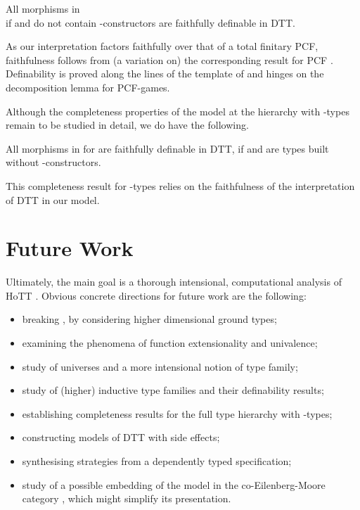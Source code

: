 \documentclass[runningheads,a4paper]{llncs}
\begin{document}
\begin{theorem}\label{thm:fdef} All morphisms in \\  if  and  do not contain -constructors are faithfully definable in \textsf{DTT}.
\end{theorem}
As our interpretation factors faithfully over that of a total finitary PCF, faithfulness follows from (a variation on) the corresponding result for PCF \cite{abramsky2000full}. Definability is proved along the lines of the template of \cite{Abramsky00axiomsfor} and hinges on the decomposition lemma for PCF-games.

Although the completeness properties of the model at the hierarchy with -types remain to be studied in detail, we do have the following.

\begin{theorem}\label{thm:complid} All morphisms in  for  are faithfully definable in \textsf{DTT}, if  and  are types built without -constructors.
\end{theorem}
This completeness result for -types relies on the faithfulness of the interpretation of \textsf{DTT} in our model.
\vspace{-5pt}
\section{Future Work}\vspace{-7pt}
Ultimately, the main goal is a thorough intensional, computational analysis of HoTT \cite{hottbook}. Obvious concrete directions for future work are the following:\vspace{-2pt}
\begin{itemize}
\item breaking , by considering higher dimensional ground types; 
\item examining the phenomena of function extensionality and univalence;
\item study of universes and a more intensional notion of type family;
\item study of (higher) inductive type families and their definability results;
\item establishing completeness results for the full type hierarchy with -types;
\item constructing models of \textsf{DTT} with side effects;
\item synthesising strategies from a dependently typed specification;
\item study of a possible embedding of the model in the co-Eilenberg-Moore category , which might simplify its presentation.
\end{itemize}
\vspace{-3pt}
\end{document}
